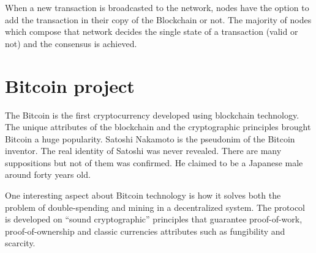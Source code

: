 When a new transaction is broadcasted to the network, nodes have the option to add the transaction in their copy of the Blockchain or not. The majority of nodes which compose that network decides the single state of a transaction (valid or not) and the consensus is achieved.


\section{Bitcoin project}
The Bitcoin is the first cryptocurrency developed using blockchain technology. The unique attributes of the blockchain and the cryptographic principles
brought Bitcoin a huge popularity. Satoshi Nakamoto is the pseudonim of the
Bitcoin inventor. The real identity of Satoshi was never revealed. There are
many suppositions but not of them was confirmed. He claimed to be a Japanese
male around forty years old.

One interesting aspect about Bitcoin technology is how it solves both the problem of double-spending and mining in a decentralized system. The protocol is developed on “sound cryptographic” principles that guarantee proof-of-work, proof-of-ownership and classic currencies attributes such as fungibility and scarcity.

